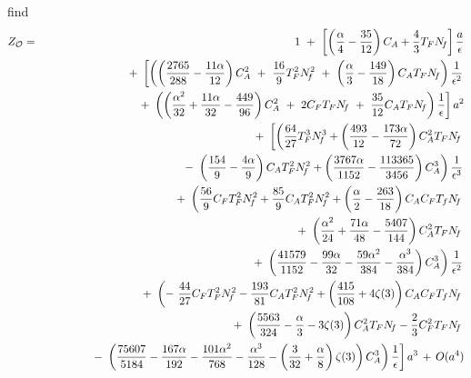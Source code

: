 \documentclass[a4paper,11pt]{article}
\newcommand{\Nf}{N_{\!f}}
\begin{document}
find 
\begin{eqnarray} 
Z_{\cal O} &=& 1 ~+~ \left[ \left( \frac{\alpha}{4} - \frac{35}{12} \right) C_A 
+ \frac{4}{3} T_F \Nf \right] \frac{a}{\epsilon} \nonumber \\
&& +~ \left[ \left( \left( \frac{2765}{288} - \frac{11\alpha}{12} \right) 
C_A^2 ~+~ \frac{16}{9} T_F^2 \Nf^2 ~+~ \left( \frac{\alpha}{3} - \frac{149}{18}
\right) C_A T_F \Nf \right) \frac{1}{\epsilon^2} \right.  \nonumber \\
&& \left. ~~~~~+~ \left( \left( \frac{\alpha^2}{32} + \frac{11\alpha}{32} 
- \frac{449}{96} \right) C_A^2 ~+~ 2 C_F T_F \Nf ~+~ \frac{35}{12} C_A T_F \Nf 
\right) \frac{1}{\epsilon} \right] a^2 \nonumber \\ 
&& +~ \left[ \left( \frac{64}{27} T_F^3 \Nf^3 + \left( \frac{493}{12} 
- \frac{173\alpha}{72} \right) C_A^2 T_F \Nf \right. \right. \nonumber \\
&& \left. \left. ~~~~-~ \left( \frac{154}{9} - \frac{4\alpha}{9} \right) 
C_A T_F^2 \Nf^2 + \left( \frac{3767\alpha}{1152} - \frac{113365}{3456} \right) 
C_A^3 \right) \frac{1}{\epsilon^3} \right. \nonumber \\ 
&& \left. ~~~~+~ \left( \frac{56}{9} C_F T_F^2 \Nf^2 
+ \frac{85}{9} C_A T_F^2 \Nf^2 + \left( \frac{\alpha}{2} - \frac{263}{18} 
\right) C_A C_F T_f \Nf \right. \right. \nonumber \\
&& \left. \left. ~~~~~~~~~~~~+~ \left( \frac{\alpha^2}{24} 
+ \frac{71\alpha}{48} - \frac{5407}{144} \right) C_A^2 T_F \Nf \right. \right.
\nonumber \\ 
&& \left. \left. ~~~~~~~~~~~~+~ \left( \frac{41579}{1152} - \frac{99\alpha}{32}
- \frac{59\alpha^2}{384} - \frac{\alpha^3}{384} \right) C_A^3 \right) 
\frac{1}{\epsilon^2} \right. \nonumber \\  
&& \left. ~~~~+~ \left( -~ \frac{44}{27} C_F T_F^2 \Nf^2 
- \frac{193}{81} C_A T_F^2 \Nf^2 + \left( \frac{415}{108} + 4\zeta(3) \right) 
C_A C_F T_f \Nf \right. \right. \nonumber \\
&& \left. \left. ~~~~~~~~~~~~+~ \left( \frac{5563}{324} 
- \frac{\alpha}{3} - 3\zeta(3) \right) C_A^2 T_F \Nf 
- \frac{2}{3} C_F^2 T_F \Nf \right. \right. \nonumber \\ 
&& \left. \left. ~~~~~~~~~~~~-~ \left( \frac{75607}{5184} 
- \frac{167\alpha}{192} - \frac{101\alpha^2}{768} - \frac{\alpha^3}{128}
- \left( \frac{3}{32} + \frac{\alpha}{8} \right) \zeta(3) \right) C_A^3 \right)
\frac{1}{\epsilon} \right] a^3 \,+\, O(a^4) \nonumber \\  
\label{Zo} 
\end{eqnarray} 
\end{document}
